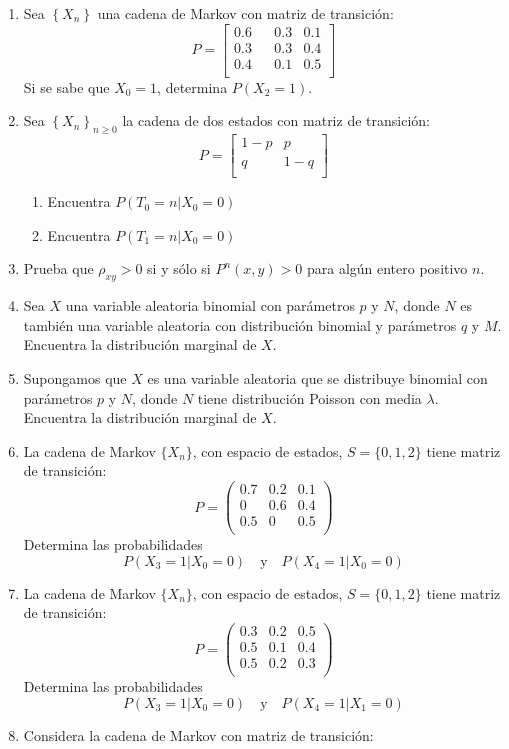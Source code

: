 \documentclass{report}
\begin{document}
\begin{enumerate}
\item Sea $\left\{X_n\right\}$ una cadena de Markov con matriz de transición:
$$P= \left[
    \begin{matrix}
        0.6 & & 0.3 & 0.1 \\
        0.3 & & 0.3 & 0.4 \\
        0.4 & & 0.1 & 0.5 \\
    \end{matrix}
    \right]
$$
Si se sabe que $X_0=1$, determina $P(X_2 = 1)$.
\item Sea $\left\{X_n\right\}_{n\geq 0}$ la cadena de dos estados con matriz de transición:
$$P= \left[
    \begin{matrix}
        1-p &  p \\
        q   &  1-q \\
    \end{matrix}
    \right]
$$
\begin{enumerate}
    \item Encuentra $P(\left. T_0=n\right\vert X_0=0)$
    \item Encuentra $P(\left. T_1=n\right\vert X_0=0)$
\end{enumerate}
\item Prueba que $\rho_{xy}>0$ si y sólo si $P^n(x,y)>0$ para algún entero positivo $n$.
\item Sea $X$ una variable aleatoria binomial con parámetros $p$ y $N$, donde $N$ es también una variable aleatoria con distribución binomial y parámetros $q$ y $M$. Encuentra la distribución marginal de $X$.
\item Supongamos que $X$ es una variable aleatoria que se distribuye binomial con parámetros $p$ y $N$, donde $N$ tiene distribución Poisson con media $\lambda$. Encuentra la distribución marginal de $X$. 
\item La cadena de Markov $\{X_n\}$, con espacio de estados, $S =\{0,1,2\}$ tiene matriz de transición:
$$
P = \left(\begin{matrix}
	0 .7 & 0.2 & 0.1 \\
	0    & 0.6 & 0.4 \\
	0 .5 & 0  & 0.5 \\
\end{matrix}\right)
$$
Determina las probabilidades 
$$
P(X_3=1\vert X_0=0)\quad \mbox{y}\quad P(X_4=1\vert X_0=0)
$$
\item La cadena de Markov $\{X_n\}$, con espacio de estados, $S =\{0,1,2\}$ tiene matriz de transición:
$$
P = \left(\begin{matrix}
	0 .3 & 0.2 & 0.5 \\
	0.5  & 0.1 & 0.4 \\
	0 .5 & 0.2  & 0.3 \\
\end{matrix}\right)
$$
Determina las probabilidades 
$$
P(X_3=1\vert X_0=0)\quad \mbox{y}\quad P(X_4=1\vert X_1=0)
$$
\item Considera la cadena de Markov con matriz de transición:


\end{enumerate}
\end{document}
